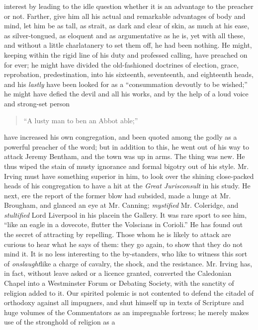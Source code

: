 interest by leading to the idle question whether it is an
advantage to the preacher or not. Farther, give him all his actual
and remarkable advantages of body and mind, let him be as tall, as
strait, as dark and clear of skin, as much at his ease, as
silver-tongued, as eloquent and as argumentative as he is, yet
with all these, and without a little charlatanery to set them off,
he had been nothing. He might, keeping within the rigid line of
his duty and professed calling, have preached on for ever; he
might have divided the old-fashioned doctrines of election, grace,
reprobation, predestination, into his sixteenth, seventeenth, and
eighteenth heads, and his \emph{lastly} have been looked for as a
``consummation devoutly to be wished;'' he might have defied the
devil and all his works, and by the help of a loud voice and
strong-set person
\begin{quote}
  ``A lusty man to ben an Abbot able;''\textemdash
\end{quote}
have increased his own congregation, and been quoted among the
godly as a powerful preacher of the word; but in addition to this,
he went out of his way to attack Jeremy Bentham, and the town was
up in arms. The thing was new. He thus wiped the stain of musty
ignorance and formal bigotry out of his style. Mr. Irving must
have something superior in him, to look over the shining
close-packed heads of his congregation to have a hit at the \emph{Great
Jurisconsult} in his study. He next, ere the report of the former
blow had subsided, made a lunge at Mr. Brougham, and glanced an
eye at Mr. Canning; \emph{mystified} Mr. Coleridge, and \emph{stultified}
Lord Liverpool in his place\textemdash in the Gallery. It was rare
sport to see him, ``like an eagle in a dovecote, flutter the
Volscians in Corioli.'' He has found out the secret of attracting
by repelling. Those whom he is likely to attack are curious to
hear what he says of them: they go again, to show that they do not
mind it. It is no less interesting to the by-standers, who like to
witness this sort of \emph{onslaught}\textemdash like a charge of
cavalry, the shock, and the resistance. Mr. Irving has, in fact,
without leave asked or a licence granted, converted the Caledonian
Chapel into a Westminster Forum or Debating Society, with the
sanctity of religion added to it. Our spirited polemic is not
contented to defend the citadel of orthodoxy against all
impugners, and shut himself up in texts of Scripture and huge
volumes of the Commentators as an impregnable fortress;\textemdash
he merely makes use of the stronghold of religion as a
